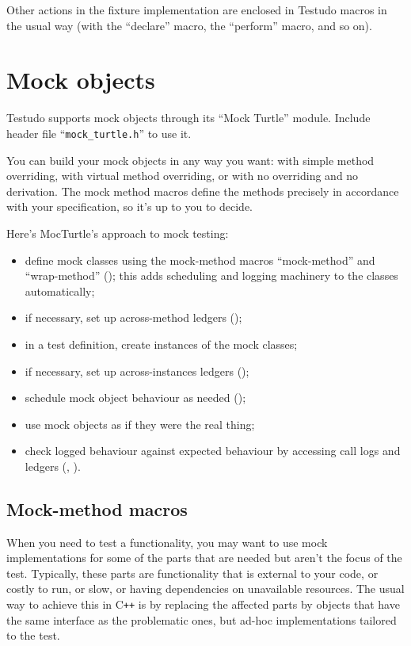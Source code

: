 \documentclass[twoside, a4paper, article]{memoir}
\providecommand\typesetexample[1]{%
}
\newcommand*\Cpp{C\texttt{++}}
\begin{document}
\typesetexample{fixture-members}

Other actions in the fixture implementation are enclosed in Testudo macros in
the usual way (with the ``declare'' macro, the ``perform'' macro, and so on).


\chapter{Mock objects}
\label{cha:mock-objects}

Testudo supports mock objects through its ``Mock Turtle'' module.  Include
header file ``\texttt{mock\_turtle.h}'' to use it.

\typesetexample{include-mock-turtle}

You can build your mock objects in any way you want: with simple method
overriding, with virtual method overriding, or with no overriding and no
derivation.  The mock method macros define the methods precisely in accordance
with your specification, so it's up to you to decide.

Here's MocTurtle's approach to mock testing:
\begin{itemize}
\item define mock classes using the mock-method macros ``mock-method'' and
  ``wrap-method'' (); this adds scheduling and
  logging machinery to the classes automatically;
\item if necessary, set up across-method ledgers
  ();
\item in a test definition, create instances of the mock classes;
\item if necessary, set up across-instances ledgers
  ();
\item schedule mock object behaviour as needed
  ();
\item use mock objects as if they were the real thing;
\item check logged behaviour against expected behaviour by accessing call logs
  and ledgers (, ).
\end{itemize}

\section{Mock-method macros}
\label{sec:mock-method-macros}

When you need to test a functionality, you may want to use mock implementations
for some of the parts that are needed but aren't the focus of the test.
Typically, these parts are functionality that is external to your code, or
costly to run, or slow, or having dependencies on unavailable resources.  The
usual way to achieve this in \Cpp{} is by replacing the affected parts by
objects that have the same interface as the problematic ones, but ad-hoc
implementations tailored to the test.
\end{document}

